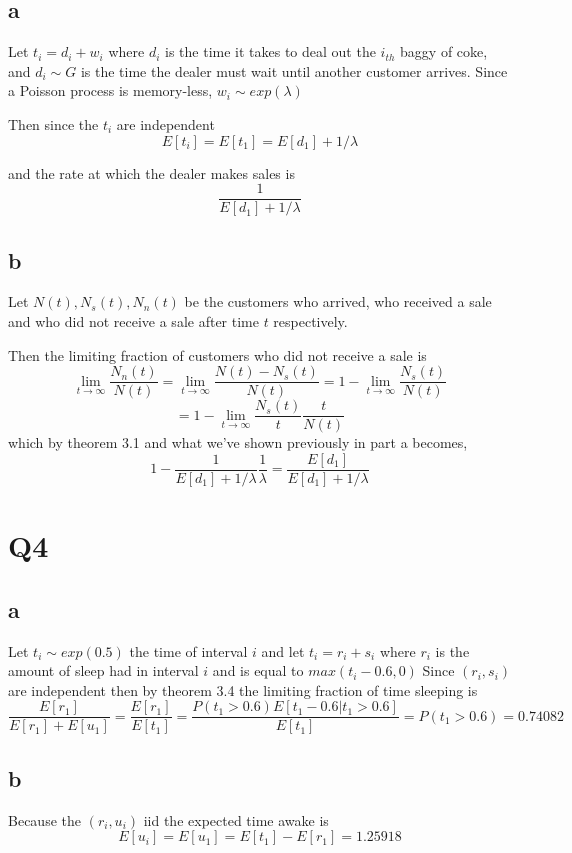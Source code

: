 \documentclass{article}
\begin{document}
\subsection*{a}

Let $t_i = d_i + w_i$ where $d_i$ is the time it takes to deal out the $i_{th}$ baggy of coke, and $d_i \sim G$ is the time the dealer must wait until another customer arrives. Since a Poisson process is memory-less, $w_i \sim exp(\lambda)$

Then since the $t_i$ are independent
$$E[t_i] = E[t_1] = E[d_1] + 1/\lambda$$ 

and the rate at which the dealer makes sales is
$$
\frac{1}{E[d_1] + 1/\lambda}
$$

\subsection*{b}
Let $N(t), N_s(t), N_n(t)$ be the customers who arrived, who received a sale and who did not receive a sale after time $t$ respectively. 

Then the limiting fraction of customers who did not receive a sale is 
$$
\lim_{t \to \infty} \frac{N_n(t)}{N(t)}
=
\lim_{t \to \infty} \frac{N(t) - N_s(t)}{N(t)} = 1 - \lim_{t \to \infty} \frac{N_s(t)}{N(t)}
$$
$$
= 1 - \lim_{t \to \infty} \frac{N_s(t)}{t}\frac{t}{N(t)}
$$
which by theorem 3.1 and what we've shown previously in part a becomes,
$$
1 - \frac{1}{E[d_1] + 1/\lambda} \frac{1}{\lambda} = \frac{E[d_1]}{E[d_1] + 1/\lambda}
$$

\section*{Q4}
\subsection*{a}
Let $t_i \sim exp(0.5)$ the time of interval $i$ and let $t_i = r_i + s_i$ where $r_i$ is the amount of sleep had in interval $i$ and is equal to $max(t_i - 0.6, 0)$ 
Since $(r_i, s_i)$ are independent then by theorem 3.4 the limiting fraction of time sleeping is
$$
\frac{E[r_1]}{E[r_1] + E[u_1]} = \frac{E[r_1]}{E[t_1]} = \frac{P(t_1>0.6)E[t_1 - 0.6| t_1 > 0.6]}{E[t_1]} = P(t_1 > 0.6) = 0.74082
$$
\subsection*{b}
Because the $(r_i, u_i)$ iid the expected time awake is
$$
E[u_i] = E[u_1] = E[t_1] - E[r_1] = 1.25918
$$
\end{document}
